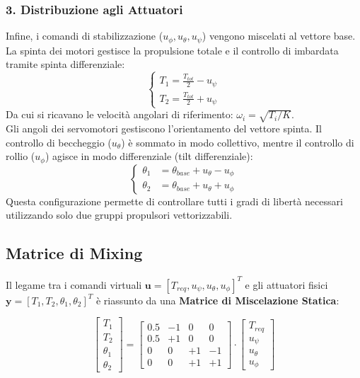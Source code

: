 \subsubsection{3. Distribuzione agli Attuatori}
Infine, i comandi di stabilizzazione ($u_\phi, u_\theta, u_\psi$) vengono miscelati al vettore base.
\\La spinta dei motori gestisce la propulsione totale e il controllo di imbardata tramite spinta differenziale:
\begin{equation}
    \begin{cases}
        T_{1} = \frac{T_{tot}}{2} - u_{\psi} \\
        T_{2}  = \frac{T_{tot}}{2} + u_{\psi}
    \end{cases}
\end{equation}
Da cui si ricavano le velocità angolari di riferimento: $\omega_{i} = \sqrt{T_{i}/K}$.
\\Gli angoli dei servomotori gestiscono l'orientamento del vettore spinta. Il controllo di beccheggio ($u_\theta$) è sommato in modo collettivo, mentre il controllo di rollio ($u_\phi$) agisce in modo differenziale (tilt differenziale):
\begin{equation}
    \begin{cases}
        \theta_1 &= \theta_{base} + u_\theta - u_\phi \\
        \theta_2 &= \theta_{base} + u_\theta + u_\phi
    \end{cases}
\end{equation}
Questa configurazione permette di controllare tutti i gradi di libertà necessari utilizzando solo due gruppi propulsori vettorizzabili.

\subsection{Matrice di Mixing}
Il legame tra i comandi virtuali $\mathbf{u} = [T_{req}, u_\psi, u_\theta, u_\phi]^T$ e gli attuatori fisici $\mathbf{y} = [T_1, T_2, \theta_1, \theta_2]^T$ è riassunto da una \textbf{Matrice di Miscelazione Statica}:

\begin{equation}
    \begin{bmatrix} T_1 \\ T_2 \\ \theta_1 \\ \theta_2 \end{bmatrix} = 
    \begin{bmatrix} 
        0.5 & -1 & 0 & 0 \\ 
        0.5 & +1 & 0 & 0 \\ 
        0 & 0 & +1 & -1 \\ 
        0 & 0 & +1 & +1 
    \end{bmatrix} 
    \cdot 
    \begin{bmatrix} T_{req} \\ u_\psi \\ u_\theta \\ u_\phi \end{bmatrix}
\end{equation}
\clearpage


